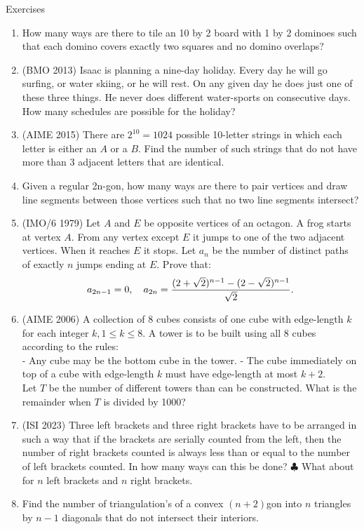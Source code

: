 \begin{xcb}{Exercises}
\begin{enumerate}
\item How many ways are there to tile an 10 by 2 board with 1 by 2 dominoes such that each domino covers exactly two squares and no domino overlaps?
\item (BMO 2013) Isaac is planning a nine-day holiday. Every day he will go surfing, or water skiing, or he will rest. On any given day he does just one of these three things. He never does different water-sports on consecutive days. How many schedules are possible for the holiday?
\item  (AIME 2015) There are $2^{10} = 1024$ possible 10-letter strings in which each letter is either an $A$ or a $B$. Find the number of such strings that do not have more than 3 adjacent letters that are identical.
\item Given a regular 2n-gon, how many ways are there to pair vertices and draw line segments between those vertices such that no two line segments intersect?
\item(IMO/6 1979) Let $A$ and $E$ be opposite vertices of an octagon. A frog starts at vertex $A.$ From any vertex except $E$ it jumps to one of the two adjacent vertices. When it reaches $E$ it stops. Let $a_n$ be the number of distinct paths of exactly $n$ jumps ending at $E$. Prove that:\[a_{2n-1}=0, \quad a_{2n}={(2+\sqrt2)^{n-1} - (2-\sqrt2)^{n-1} \over\sqrt2}.\]
\item (AIME 2006) A collection of 8 cubes consists of one cube with edge-length $k$ for each integer $k, 1 \le k \le 8.$ A tower is to be built using all 8 cubes according to the rules:\\
- Any cube may be the bottom cube in the tower.
- The cube immediately on top of a cube with edge-length $k$ must have edge-length at most $k+2.$\\
Let $T$ be the number of different towers than can be constructed. What is the remainder when $T$ is divided by 1000?
\item (ISI 2023) Three left brackets and three right brackets have to be arranged in such a way that if the brackets are serially counted from the left, then the number of right brackets counted is always less than or equal to the number of left brackets counted. In how many ways can this be done? $\clubsuit$ What about for $n$ left brackets and $n$ right brackets.  
\item  Find the number of triangulation's of a convex $(n + 2)$gon into $n$ triangles by $n-1$ diagonals that do not intersect their interiors.

\end{enumerate}
\end{xcb}
